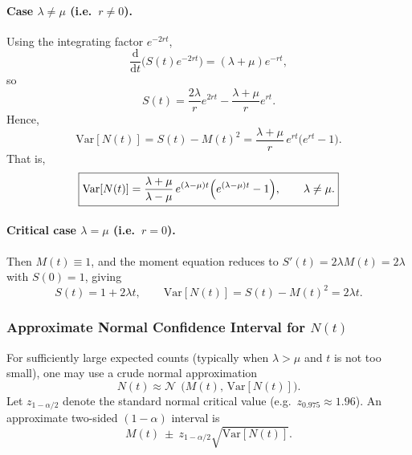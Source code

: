 {\paragraph{Case \(\lambda\neq\mu\) (i.e.\ \(r\neq 0\)).}
Using the integrating factor \(e^{-2rt}\),
\begin{equation}
\frac{\mathrm{d}}{\mathrm{d}t}\bigl(S(t)e^{-2rt}\bigr)=(\lambda+\mu)e^{-rt},
\end{equation}
so
\begin{equation}
S(t)
=
\frac{2\lambda}{r}e^{2rt}
-
\frac{\lambda+\mu}{r}e^{rt}.
\end{equation}
Hence,
\begin{equation}
\mathrm{Var}[N(t)]
=
S(t)-M(t)^2
=
\frac{\lambda+\mu}{r}\,e^{rt}\bigl(e^{rt}-1\bigr).
\end{equation}
That is,
\begin{equation}
\boxed{
\mathrm{Var}[N(t)]
=
\frac{\lambda+\mu}{\lambda-\mu}\,
e^{(\lambda-\mu)t}\Bigl(e^{(\lambda-\mu)t}-1\Bigr),
\qquad \lambda\neq\mu.
}
\end{equation}

\paragraph{Critical case \(\lambda=\mu\) (i.e.\ \(r=0\)).}
Then \(M(t)\equiv 1\), and the moment equation reduces to \(S'(t)=2\lambda M(t)=2\lambda\) with \(S(0)=1\), giving
\begin{equation}
S(t)=1+2\lambda t,
\qquad
\boxed{\mathrm{Var}[N(t)]=S(t)-M(t)^2=2\lambda t.}
\end{equation}

\subsubsection*{Approximate Normal Confidence Interval for \(N(t)\)}
For sufficiently large expected counts (typically when \(\lambda>\mu\) and \(t\) is not too small), one may use a crude normal approximation
\begin{equation}
N(t)\approx \mathcal{N}~~\!\bigl(M(t),\,\mathrm{Var}[N(t)]\bigr).
\end{equation}
Let \(z_{1-\alpha/2}\) denote the standard normal critical value (e.g.\ \(z_{0.975}\approx 1.96\)). An approximate two-sided \((1-\alpha)\) interval is
\begin{equation}
\boxed{
M(t)\ \pm\ z_{1-\alpha/2}\sqrt{\mathrm{Var}[N(t)]}.
}
\end{equation}
}
